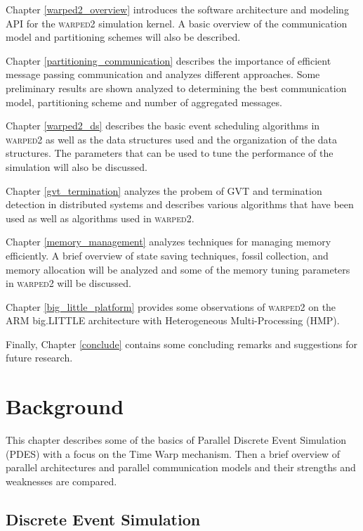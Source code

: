 \documentclass[11pt]{book}
\begin{document}
Chapter \ref{warped2_overview} introduces the software architecture and modeling API for
the \textsc{warped2} simulation kernel. A basic overview of the communication model and
partitioning schemes will also be described.

Chapter \ref{partitioning_communication} describes the importance of efficient message passing
communication and analyzes different approaches. Some preliminary results are shown analyzed
to determining the best communication model, partitioning scheme and number of aggregated
messages.

Chapter \ref{warped2_ds} describes the basic event scheduling algorithms in \textsc{warped2}
as well as the data structures used and the organization of the data structures. The parameters
that can be used to tune the performance of the simulation will also be discussed.

Chapter \ref{gvt_termination} analyzes the probem of GVT and termination detection in distributed
systems and describes various algorithms that have been used as well as algorithms used in
\textsc{warped2}.

Chapter \ref{memory_management} analyzes techniques for managing memory efficiently. A brief
overview of state saving techniques, fossil collection, and memory allocation will be analyzed
and some of the memory tuning parameters in \textsc{warped2} will be discussed.

Chapter \ref{big_little_platform} provides some observations of \textsc{warped2} on the
ARM big.LITTLE architecture with Heterogeneous Multi-Processing (HMP).

Finally, Chapter \ref{conclude} contains some concluding remarks and suggestions for future
research.



\chapter{Background}\label{background}

This chapter describes some of the basics of Parallel Discrete Event Simulation (PDES) with
a focus on the Time Warp mechanism. Then a brief overview of parallel architectures and
parallel communication models and their strengths and weaknesses are compared.

\section{Discrete Event Simulation}
\end{document}
